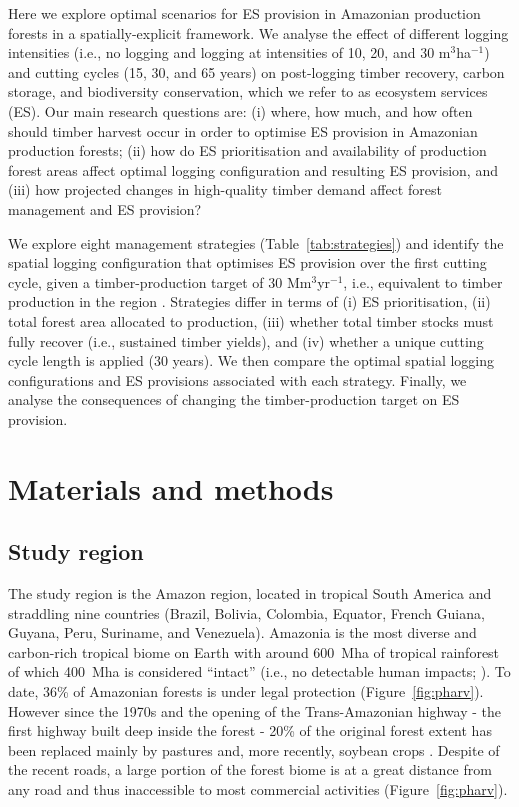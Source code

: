 \documentclass[12pt]{article}
\begin{document}
Here we explore optimal scenarios for ES provision in Amazonian production forests in a spatially-explicit framework. We analyse the effect of different logging intensities (i.e., no logging and logging at intensities of 10, 20, and 30 m$^3$ha$^{-1}$) and cutting cycles (15, 30, and 65 years) on post-logging timber recovery, carbon storage, and biodiversity conservation, which we refer to as ecosystem services (ES). Our main research questions are: (i) where, how much, and how often should timber harvest occur in order to optimise ES provision in Amazonian production forests; (ii) how do ES prioritisation and availability of production forest areas affect optimal logging configuration and resulting ES provision, and (iii) how projected changes in high-quality timber demand affect forest management and ES provision? 

We explore eight management strategies (Table~\ref{tab:strategies}) and identify the spatial logging configuration that optimises ES provision over the first cutting cycle, given a timber-production target of 30 Mm$^3$yr$^{-1}$, i.e., equivalent to timber production in the region \cite{Lentini2005}. Strategies differ in terms of (i) ES prioritisation, (ii) total forest area allocated to production, (iii) whether total timber stocks must fully recover (i.e., sustained timber yields), and (iv) whether a unique cutting cycle length is applied (30 years). We then compare the optimal spatial logging configurations and ES provisions associated with each strategy. Finally, we analyse the consequences of changing the timber-production target on ES provision.

\section*{Materials and methods}

\subsection*{Study region}

The study region is the Amazon region, located in tropical South America and straddling nine countries (Brazil, Bolivia, Colombia, Equator, French Guiana, Guyana, Peru, Suriname, and Venezuela). Amazonia is the most diverse and carbon-rich tropical biome on Earth \cite{Avitabile2016,Pimm2014} with around 600~Mha of tropical rainforest of which 400~Mha is considered “intact” (i.e., no detectable human impacts; \cite{Potapov2017}). To date, 36\% of Amazonian forests is under legal protection \cite{WDPA2016} (Figure~\ref{fig:pharv}). However since the 1970s and the opening of the Trans-Amazonian highway - the first highway built deep inside the forest - 20\% of the original forest extent has been replaced mainly by pastures and, more recently, soybean crops \cite{Kalamandeen2018,Fearnside2017}. Despite of the recent roads, a large portion of the forest biome is at a great distance from any road and thus inaccessible to most commercial activities (Figure~\ref{fig:pharv}).
\end{document}
